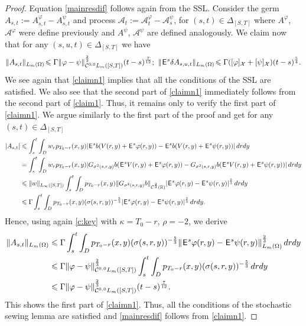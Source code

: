 \documentclass[12pt]{article}
\theoremstyle{definition}
\DeclareMathOperator{\1}{\mathbbm{1}}%
\def\E{\hskip.15ex\mathsf{E}\hskip.10ex}
\def\phi{\varphi}
\renewcommand{\le}{\leqslant}
\newcommand{\A}{\mathcal{A}}
\newcommand{\C}{\mathcal{C}}
\newcommand{\R}{\mathbb{R}}
\newcommand{\X}{\mathcal{X}}
\begin{document}
\begin{proof}
Equation \eqref{mainresdif} follows again from the SSL. Consider the germ $A_{s,t}:=A_{s,t}^\phi-A_{s,t}^\psi$ and process 
$\A_{t}:=\A_{t}^\phi-\A_{s}^\psi$, for $ (s,t)\in\Delta_{[S,T]}$
where $A^\phi$, $\A^\phi$ were define previously and $A^\psi$, $\A^\psi$ are defined analogously. 
We claim now that for any $(s,u,t)\in\Delta_{[S,T]}$ we have 
\begin{equation}\label{claimn1}
	\|A_{s,t}\|_{L_m(\Omega)}\!\le  \Gamma \|\phi-\psi\|^{\frac23}_{\C^{0,0}L_m([S,T])}(t-s)^{\frac7{12}};\,\,
	\|\E^s\delta A_{s,u,t}\|_{L_m(\Omega)}\!\le  \Gamma ([\phi]_{\X}+[\psi]_{\X})(t-s)^{\frac54}.%
\end{equation}
We see again that \eqref{claimn1}  implies that all the conditions of the SSL  are satisfied. We also see that the second part of \eqref{claimn1} immediately follows from the second part of \eqref{claim1}. Thus, it remains only to verify the first part of  \eqref{claimn1}. We argue similarly to the first part of the proof and get for any $(s,t)\in\Delta_{[S,T]}$
\begin{align*}
	|A_{s,t}|&\le \int_s^t \int_D w_r  p_{T_0-r}(x,y) |\E^s b( V(r,y)+\E^s \phi(r,y))-\E^s b( V(r,y)+\E^s \psi(r,y))|\,dr dy\\
	&= \int_s^t \int_D w_r p_{T_0-r}(x,y) |G_{\sigma^2(s,r,y)} b(\E^s V(r,y)+\E^s\phi(r,y))-G_{\sigma^2(s,r,y)} b(\E^s V(r,y)+\E^s\psi(r,y))|\,dr dy\\
	&\le \|w\|_{L_\infty([S,T])} \int_s^t \int_D    p_{T_0-r}(x,y) \|G_{\sigma^2(s,r,y)} b\|_{\C^{\frac23}(\R)}|\E^s\phi(r,y)-\E^s\psi(r,y)|^{\frac23}\,dr dy\\
	&\le \Gamma\int_s^t \int_D p_{T_0-r}(x,y) (\sigma(s,r,y))^{-\frac53}|\E^s\phi(r,y)-\E^s\psi(r,y)|^{\frac23}\,dr dy. 
\end{align*}
Hence, using again \cref{c:key} with $ \kappa=T_0-r$, $\rho=-2$, we derive 
\begin{align*}
\|A_{s,t}\|_{L_m(\Omega)}&\le  \Gamma\int_s^t \int_D p_{T_0-r}(x,y) (\sigma(s,r,y))^{-\frac53}\|\E^s\phi(r,y)-\E^s\psi(r,y)\|^{\frac23}_{L_m(\Omega)}\,dr dy\\
&\le  \Gamma\|\phi-\psi\|^{\frac23}_{\C^{0,0}L_m([S,T])}\int_s^t \int_D p_{T_0-r}(x,y) (\sigma(s,r,y))^{-\frac53}\,dr dy\\
&\le  \Gamma\|\phi-\psi\|^{\frac23}_{\C^{0,0}L_m([S,T])}(t-s)^{\frac7{12}}. 
\end{align*}
This shows the first part of  \eqref{claimn1}. 
Thus, all the conditions of the stochastic sewing lemma are satisfied and \eqref{mainresdif} follows from \eqref{claimn1}. 

\end{proof}
\end{document}
